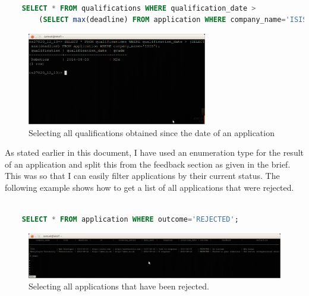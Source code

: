 \documentclass{article}
\begin{document}
\begin{center}
	\begin{lstlisting}[language=sql, showstringspaces=false]

	SELECT * FROM qualifications WHERE qualification_date > 
		(SELECT max(deadline) FROM application WHERE company_name='ISIS');

	\end{lstlisting}
\end{center}

\begin{figure}[H]
\centering
\includegraphics[width=0.7\textwidth]{img/test/test-date.png}
\caption{Selecting all qualifications obtained since the date of an application}
\label{fig:test-date}
\end{figure}

As stated earlier in this document, I have used an enumeration type for the result of an application and split this from the feedback section as given in the brief. This was so that I can easily filter applications by their current status. The following example shows how to get a list of all applications that were rejected.

\begin{center}
	\begin{lstlisting}[language=sql, showstringspaces=false]

	SELECT * FROM application WHERE outcome='REJECTED';

	\end{lstlisting}
\end{center}

\begin{figure}[H]
\centering
\includegraphics[width=1\textwidth]{img/test/test-rejected.png}
\caption{Selecting all applications that have been rejected.}
\label{fig:test-rejected}
\end{figure}
\end{document}
